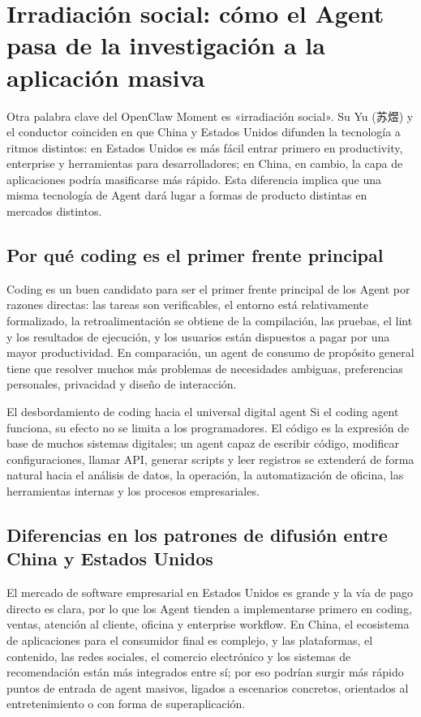 \section{Irradiación social: cómo el Agent pasa de la investigación a la aplicación masiva}

Otra palabra clave del OpenClaw Moment es «irradiación social». Su Yu (苏煜) y el conductor coinciden en que China y Estados Unidos difunden la tecnología a ritmos distintos: en Estados Unidos es más fácil entrar primero en productivity, enterprise y herramientas para desarrolladores; en China, en cambio, la capa de aplicaciones podría masificarse más rápido. Esta diferencia implica que una misma tecnología de Agent dará lugar a formas de producto distintas en mercados distintos.

\subsection{Por qué coding es el primer frente principal}

Coding es un buen candidato para ser el primer frente principal de los Agent por razones directas: las tareas son verificables, el entorno está relativamente formalizado, la retroalimentación se obtiene de la compilación, las pruebas, el lint y los resultados de ejecución, y los usuarios están dispuestos a pagar por una mayor productividad. En comparación, un agent de consumo de propósito general tiene que resolver muchos más problemas de necesidades ambiguas, preferencias personales, privacidad y diseño de interacción.

\begin{knowledgebox}{El desbordamiento de coding hacia el universal digital agent}
Si el coding agent funciona, su efecto no se limita a los programadores. El código es la expresión de base de muchos sistemas digitales; un agent capaz de escribir código, modificar configuraciones, llamar API, generar scripts y leer registros se extenderá de forma natural hacia el análisis de datos, la operación, la automatización de oficina, las herramientas internas y los procesos empresariales.
\end{knowledgebox}

\subsection{Diferencias en los patrones de difusión entre China y Estados Unidos}

El mercado de software empresarial en Estados Unidos es grande y la vía de pago directo es clara, por lo que los Agent tienden a implementarse primero en coding, ventas, atención al cliente, oficina y enterprise workflow. En China, el ecosistema de aplicaciones para el consumidor final es complejo, y las plataformas, el contenido, las redes sociales, el comercio electrónico y los sistemas de recomendación están más integrados entre sí; por eso podrían surgir más rápido puntos de entrada de agent masivos, ligados a escenarios concretos, orientados al entretenimiento o con forma de superaplicación.

